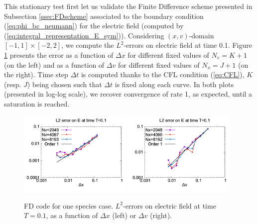 \documentclass{article}
\numberwithin{equation}{section}
\newcommand{\imh}{\textheight} %
\begin{document}
This stationary test first let us validate the Finite Difference scheme presented in Subsection \ref{ssec:FDscheme} associated to the boundary condition (\ref{eq:phi_bc_neumann}) for the electric field (computed by (\ref{eq:integral_representation_E_sym})). Considering $(x,v)$-domain $[-1,1]\times[-2,2]$, we compute the $L^2$-errors on electric field at time 0.1. Figure \ref{fig:DFerrors} presents the error as a function of $\Delta x$ for different fixed values of $N_v=K+1$ (on the left) and as a function of $\Delta v$ for different fixed values of $N_x=J+1$ (on the right). Time step $\Delta t$ is computed thanks to the CFL condition (\ref{eq:CFL}), $K$ (resp. $J$) being chosen such that $\Delta t$ is fixed along each curve. In both plots (presented in log-log scale), we recover convergence of rate 1, as expected, until a saturation is reached.

\begin{figure}
	\centering
	\renewcommand{\imh}{0.33\linewidth}
	\includegraphics[width=0.48\textwidth]{images/error_E_en_dx_acstcase.png}
	\includegraphics[width=0.48\textwidth]{images/error_E_en_dv_acstcase.png}
	\caption{FD code for one species case. $L^2$-errors on electric field at time $T=0.1$, as a function of $\Delta x$ (left) or $\Delta v$ (right).}
	\label{fig:DFerrors}
\end{figure}
\end{document}
